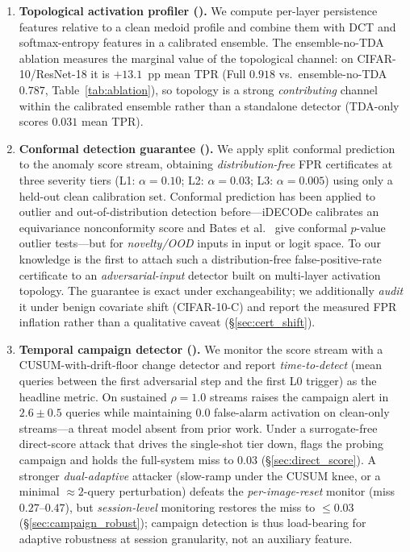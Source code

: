 \begin{enumerate}[leftmargin=*, label=\textbf{C\arabic*}]

\item \textbf{Topological activation profiler (\tamm).}
We compute per-layer persistence features relative to a clean medoid profile
and combine them with DCT and softmax-entropy features in a calibrated
ensemble. The ensemble-no-TDA ablation measures the marginal value of the
topological channel: on CIFAR-10/ResNet-18 it is $+13.1$~pp mean TPR
(Full $0.918$ vs.\ ensemble-no-TDA $0.787$, Table~\ref{tab:ablation}), so
topology is a strong \emph{contributing} channel within the calibrated
ensemble rather than a standalone detector (TDA-only scores $0.031$ mean TPR).

\item \textbf{Conformal detection guarantee (\cadg).}
We apply split conformal prediction to the anomaly score stream, obtaining 
\emph{distribution-free} FPR certificates at three severity tiers 
(L1: $\alpha{=}0.10$; L2: $\alpha{=}0.03$; L3: $\alpha{=}0.005$)
using only a held-out clean calibration set. Conformal prediction has been
applied to outlier and out-of-distribution detection before---iDECODe
\cite{kaur2022idecode} calibrates an equivariance nonconformity score and
Bates et al.\ \cite{bates2023outliers} give conformal $p$-value outlier
tests---but for \emph{novelty/OOD} inputs in input or logit space. To our
knowledge \prism is the first to attach such a distribution-free
false-positive-rate certificate to an \emph{adversarial-input} detector
built on multi-layer activation topology. The guarantee is exact under
exchangeability; we additionally \emph{audit} it under benign covariate
shift (CIFAR-10-C) and report the measured FPR inflation rather than a
qualitative caveat (\S\ref{sec:cert_shift}).

\item \textbf{Temporal campaign detector (\sacd).}
We monitor the score stream with a CUSUM-with-drift-floor change detector
and report \emph{time-to-detect} (mean queries between the first adversarial
step and the first L0 trigger) as the headline metric. On sustained
$\rho{=}1.0$ streams \sacd raises the campaign alert in $2.6 \pm 0.5$
queries while maintaining $0.0$ false-alarm activation on clean-only
streams---a threat model absent from prior work. Under a surrogate-free
direct-score attack that drives the single-shot tier down, \sacd flags the
probing campaign and holds the full-system miss to $0.03$
(\S\ref{sec:direct_score}). A stronger \emph{dual-adaptive} attacker
(slow-ramp under the CUSUM knee, or a minimal ${\approx}2$-query perturbation)
defeats the \emph{per-image-reset} monitor (miss $0.27$--$0.47$), but
\emph{session-level} monitoring restores the miss to ${\le}0.03$
(\S\ref{sec:campaign_robust}); campaign detection is thus load-bearing for
adaptive robustness at session granularity, not an auxiliary feature.


\end{enumerate}
